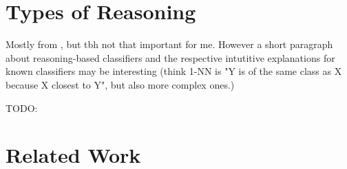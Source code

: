 



\section{Types of Reasoning}

\label{sec:reasoning}

Mostly from \cite{Derrac2015}, but tbh not that important for me. However a short paragraph about reasoning-based classifiers and the respective intutitive explanations for known classifiers may be interesting (think 1-NN is "Y is of the same class as X because X closest to Y", but also more complex ones.)

TODO: 


\section{Related Work}


 





